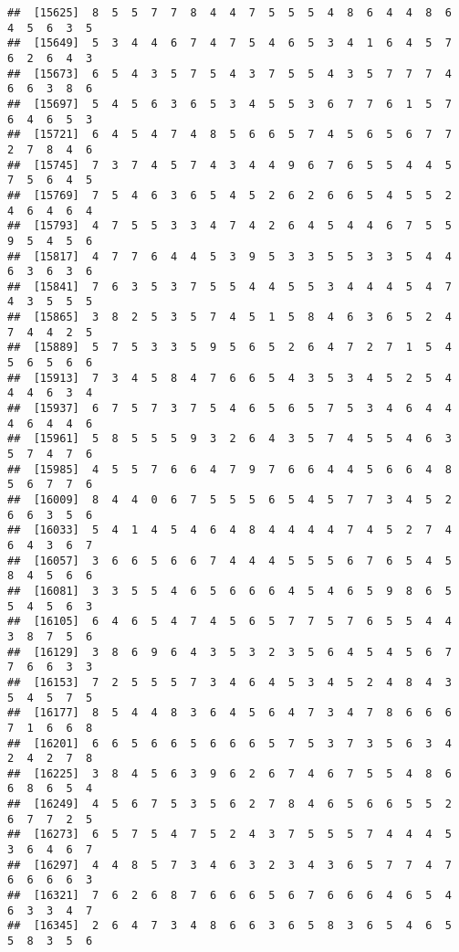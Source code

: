 \documentclass[
]{book}
\begin{document}
\begin{verbatim}
##  [15625]  8  5  5  7  7  8  4  4  7  5  5  5  4  8  6  4  4  8  6  4  5  6  3  5
##  [15649]  5  3  4  4  6  7  4  7  5  4  6  5  3  4  1  6  4  5  7  6  2  6  4  3
##  [15673]  6  5  4  3  5  7  5  4  3  7  5  5  4  3  5  7  7  7  4  6  6  3  8  6
##  [15697]  5  4  5  6  3  6  5  3  4  5  5  3  6  7  7  6  1  5  7  6  4  6  5  3
##  [15721]  6  4  5  4  7  4  8  5  6  6  5  7  4  5  6  5  6  7  7  2  7  8  4  6
##  [15745]  7  3  7  4  5  7  4  3  4  4  9  6  7  6  5  5  4  4  5  7  5  6  4  5
##  [15769]  7  5  4  6  3  6  5  4  5  2  6  2  6  6  5  4  5  5  2  4  6  4  6  4
##  [15793]  4  7  5  5  3  3  4  7  4  2  6  4  5  4  4  6  7  5  5  9  5  4  5  6
##  [15817]  4  7  7  6  4  4  5  3  9  5  3  3  5  5  3  3  5  4  4  6  3  6  3  6
##  [15841]  7  6  3  5  3  7  5  5  4  4  5  5  3  4  4  4  5  4  7  4  3  5  5  5
##  [15865]  3  8  2  5  3  5  7  4  5  1  5  8  4  6  3  6  5  2  4  7  4  4  2  5
##  [15889]  5  7  5  3  3  5  9  5  6  5  2  6  4  7  2  7  1  5  4  5  6  5  6  6
##  [15913]  7  3  4  5  8  4  7  6  6  5  4  3  5  3  4  5  2  5  4  4  4  6  3  4
##  [15937]  6  7  5  7  3  7  5  4  6  5  6  5  7  5  3  4  6  4  4  4  6  4  4  6
##  [15961]  5  8  5  5  5  9  3  2  6  4  3  5  7  4  5  5  4  6  3  5  7  4  7  6
##  [15985]  4  5  5  7  6  6  4  7  9  7  6  6  4  4  5  6  6  4  8  5  6  7  7  6
##  [16009]  8  4  4  0  6  7  5  5  5  6  5  4  5  7  7  3  4  5  2  6  6  3  5  6
##  [16033]  5  4  1  4  5  4  6  4  8  4  4  4  4  7  4  5  2  7  4  6  4  3  6  7
##  [16057]  3  6  6  5  6  6  7  4  4  4  5  5  5  6  7  6  5  4  5  8  4  5  6  6
##  [16081]  3  3  5  5  4  6  5  6  6  6  4  5  4  6  5  9  8  6  5  5  4  5  6  3
##  [16105]  6  4  6  5  4  7  4  5  6  5  7  7  5  7  6  5  5  4  4  3  8  7  5  6
##  [16129]  3  8  6  9  6  4  3  5  3  2  3  5  6  4  5  4  5  6  7  7  6  6  3  3
##  [16153]  7  2  5  5  5  7  3  4  6  4  5  3  4  5  2  4  8  4  3  5  4  5  7  5
##  [16177]  8  5  4  4  8  3  6  4  5  6  4  7  3  4  7  8  6  6  6  7  1  6  6  8
##  [16201]  6  6  5  6  6  5  6  6  6  5  7  5  3  7  3  5  6  3  4  2  4  2  7  8
##  [16225]  3  8  4  5  6  3  9  6  2  6  7  4  6  7  5  5  4  8  6  6  8  6  5  4
##  [16249]  4  5  6  7  5  3  5  6  2  7  8  4  6  5  6  6  5  5  2  6  7  7  2  5
##  [16273]  6  5  7  5  4  7  5  2  4  3  7  5  5  5  7  4  4  4  5  3  6  4  6  7
##  [16297]  4  4  8  5  7  3  4  6  3  2  3  4  3  6  5  7  7  4  7  6  6  6  6  3
##  [16321]  7  6  2  6  8  7  6  6  6  5  6  7  6  6  6  4  6  5  4  6  3  3  4  7
##  [16345]  2  6  4  7  3  4  8  6  6  3  6  5  8  3  6  5  4  6  5  5  8  3  5  6

\end{verbatim}
\end{document}
